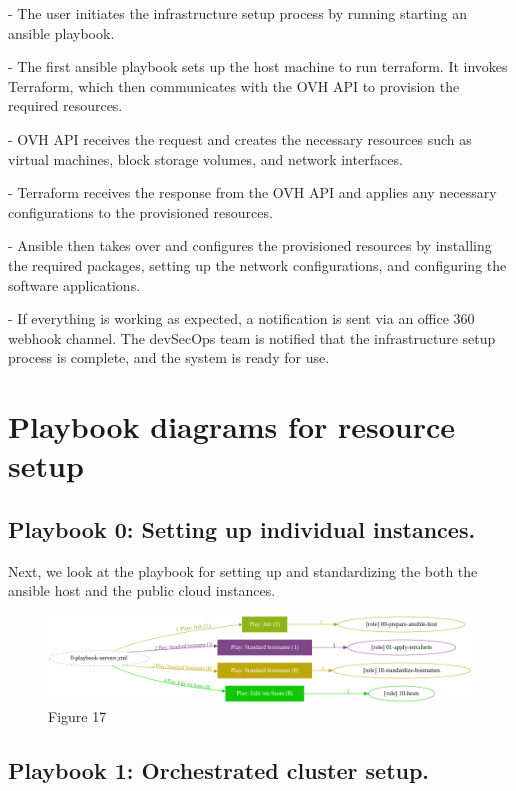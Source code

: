 - The user initiates the infrastructure setup process by running starting an ansible playbook.

- The first ansible playbook sets up the host machine to run terraform. It invokes Terraform, which then communicates with the OVH API to provision the required resources.

- OVH API receives the request and creates the necessary resources such as virtual machines, block storage volumes, and network interfaces.

- Terraform receives the response from the OVH API and applies any necessary configurations to the provisioned resources.

- Ansible then takes over and configures the provisioned resources by installing the required packages, setting up the network configurations, and configuring the software applications.

- If everything is working as expected, a notification is sent via an office 360 webhook channel. The devSecOps team is notified that the infrastructure setup process is complete, and the system is ready for use.

\section{Playbook diagrams for resource setup}

\subsection{Playbook 0: Setting up individual instances.}

Next, we look at the playbook for setting up and standardizing the both the ansible host and the public cloud instances.


\begin{figure}[H]\centering
\includegraphics[width=1.0\textwidth,angle=00]{assets/f17.png}
\caption{Figure 17}
\label{fig:fig17}
\end{figure}

\subsection{Playbook 1: Orchestrated cluster setup.}

